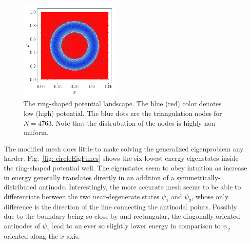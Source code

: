 \documentclass[a4paper,12pt]{article}
\begin{document}
\begin{figure}
\vspace{-20pt}
\hspace{-30pt}
\begin{center}
\includegraphics[width=0.45\textwidth]{../figs/circle_pot.pdf}
\caption{The ring-shaped potential landscape. The blue (red) color denotes low (high) potential. The blue dots are the triangulation nodes for $N=4763$. Note that the distrubution of the nodes is highly non-uniform. }
\label{fig: circlePot}
\end{center}
\end{figure}

The modified mesh does little to make solving the generalized eigenproblem any harder. Fig.~\ref{fig: circleEigFuncs} shows the six lowest-energy eigenstates inside the ring-shaped potential well. The eigenstates seem to obey intuition as increase in energy generally translates directly in an addition of a symmetrically-distributed antinode. Interestingly, the more accurate mesh seems to be able to differentiate between the two near-degenerate states $\psi_1$ and $\psi_2$, whose only difference is the direction of the line connecting the antinodal points. Possibly due to the boundary being so close by and rectangular, the diagonally-oriented antinodes of $\psi_1$ lead to an ever so slightly lower energy in comparison to $\psi_2$ oriented along the $x$-axis.
\end{document}
